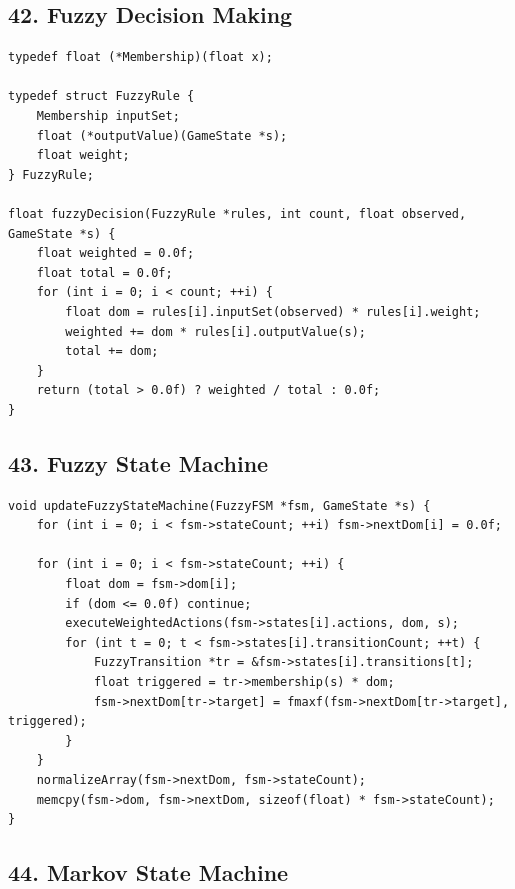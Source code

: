 \documentclass[10pt,letterpaper]{article}
\begin{document}
\subsection*{42. Fuzzy Decision Making}
{}

\begin{verbatim}
typedef float (*Membership)(float x);

typedef struct FuzzyRule {
    Membership inputSet;
    float (*outputValue)(GameState *s);
    float weight;
} FuzzyRule;

float fuzzyDecision(FuzzyRule *rules, int count, float observed, GameState *s) {
    float weighted = 0.0f;
    float total = 0.0f;
    for (int i = 0; i < count; ++i) {
        float dom = rules[i].inputSet(observed) * rules[i].weight;
        weighted += dom * rules[i].outputValue(s);
        total += dom;
    }
    return (total > 0.0f) ? weighted / total : 0.0f;
}
\end{verbatim}

\subsection*{43. Fuzzy State Machine}
{}

\begin{verbatim}
void updateFuzzyStateMachine(FuzzyFSM *fsm, GameState *s) {
    for (int i = 0; i < fsm->stateCount; ++i) fsm->nextDom[i] = 0.0f;

    for (int i = 0; i < fsm->stateCount; ++i) {
        float dom = fsm->dom[i];
        if (dom <= 0.0f) continue;
        executeWeightedActions(fsm->states[i].actions, dom, s);
        for (int t = 0; t < fsm->states[i].transitionCount; ++t) {
            FuzzyTransition *tr = &fsm->states[i].transitions[t];
            float triggered = tr->membership(s) * dom;
            fsm->nextDom[tr->target] = fmaxf(fsm->nextDom[tr->target], triggered);
        }
    }
    normalizeArray(fsm->nextDom, fsm->stateCount);
    memcpy(fsm->dom, fsm->nextDom, sizeof(float) * fsm->stateCount);
}
\end{verbatim}

\subsection*{44. Markov State Machine}
{}
\end{document}
